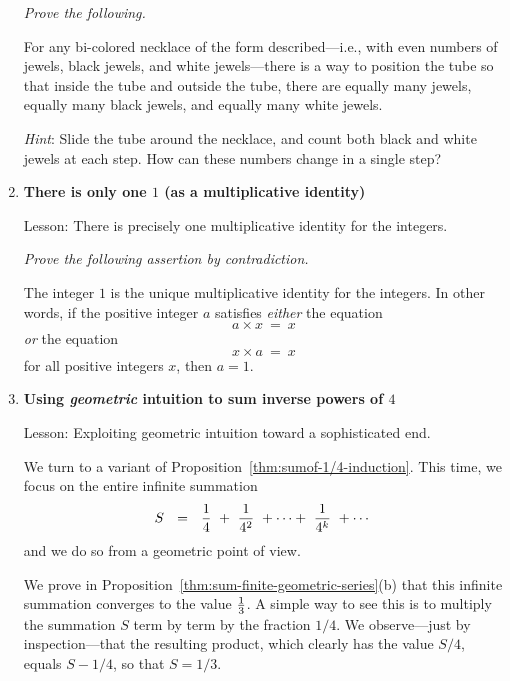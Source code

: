 \begin{enumerate}
\smallskip

{\em Prove the following.}

\begin{prop}
For any bi-colored necklace of the form described---i.e., with even numbers of jewels, black jewels, and white jewels---there is a way to position the tube so that inside the tube and outside the tube, there are equally many jewels, equally many black jewels, and equally many white jewels.
\end{prop} 

\smallskip

{\em Hint}: Slide the tube around the necklace, and count both black and white jewels at each step.  How can these numbers change in a single step?

\item
{\bf There is only one $1$ (as a multiplicative identity)}

{\sc Lesson:} There is precisely one multiplicative identity for the integers.

\smallskip

{\em Prove the following assertion by contradiction.}

\begin{prop}
The integer $1$ is the unique multiplicative identity for the integers.  In other words, if the positive integer $a$ satisfies {\em either} the equation
\[ a \times x \ = \ x \]
{\em or} the equation
\[ x \times a \ = \ x \]
for all positive integers $x$, then $a = 1$.
\end{prop}

\item
{\bf Using {\em geometric} intuition to sum inverse powers of $4$}

{\sc Lesson:} Exploiting geometric intuition toward a sophisticated end.

\smallskip

We turn to a variant of Proposition~\ref{thm:sumof-1/4-induction}.  This time, we focus on the entire infinite summation
\[ S \ \ = \ \  {1 \over 4} \ + \  {1 \over 4^2} \ + \cdots + \ {1 \over 4^k} \ + \cdots  \]
and we do so from a geometric point of view.

\smallskip

We prove in Proposition~\ref{thm:sum-finite-geometric-series}(b) that this infinite summation converges to the value ${1 \over 3}$.  A simple way to see this is to multiply the summation $S$ term by term by the fraction $1/4$.  We observe---just by inspection---that the resulting product, which clearly has the value $S/4$, equals $S - 1/4$, so that $S = 1/3$.


\end{enumerate}
